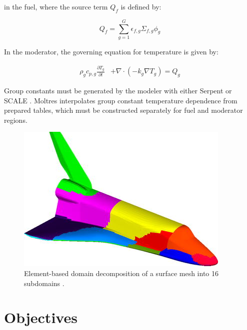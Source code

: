 \documentclass{anstrans}
\begin{document}
in the fuel, where the source term $Q_f$ is defined by:

\begin{equation}
  Q_f = \sum_{g=1}^G \epsilon_{f,g}\Sigma_{f,g}\phi_g
  \label{eq:fuel_source}
\end{equation}

In the moderator, the governing equation for temperature is given by:

\begin{align}
        \rho_gc_{p,g}\frac{\partial T_g}{\partial t} &+
        \nabla\cdot\left(-k_g\nabla T_g\right) =  Q_g
  \label{eq:moderator_temp}
\end{align}

Group constants must be generated by the modeler with either Serpent
\cite{leppanen_serpent_2015} or SCALE \cite{dehart_reactor_2011}. Moltres 
interpolates group constant temperature dependence from prepared tables, which must be
constructed separately for fuel and moderator regions. 

\begin{figure}[hbp!] %
  \centering
  \vspace{-0.3em}
  \includegraphics[width=0.95\linewidth]{fig3.jpg}
  \caption{Element-based domain decomposition of a surface mesh into 16 subdomains \cite{kirk2006}.}
  \vspace{-0.6em}
  \label{fig:decomp}
\end{figure}
\FloatBarrier

\section{Objectives}
\end{document}

